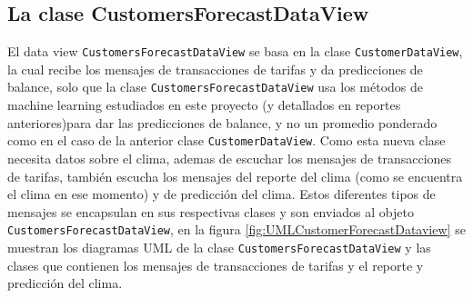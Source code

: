 \subsection{La clase CustomersForecastDataView}

El data view \texttt{CustomersForecastDataView} se basa en la clase \texttt{CustomerDataView}, la cual recibe los mensajes de transacciones de tarifas y da predicciones de balance, solo que la clase \texttt{CustomersForecastDataView} usa los métodos de machine learning estudiados en este proyecto (y detallados en reportes anteriores)para dar las predicciones de balance, y no un promedio ponderado como en el caso de la anterior clase \texttt{CustomerDataView}. Como esta nueva clase necesita datos sobre el clima, ademas de escuchar los mensajes de transacciones de tarifas, también escucha los mensajes del reporte del clima (como se encuentra el clima en ese momento) y de predicción del clima. Estos diferentes tipos de mensajes se encapsulan en sus respectivas clases y son enviados al objeto \texttt{CustomersForecastDataView}, en la figura \ref{fig:UMLCustomerForecastDataview} se muestran los diagramas UML de la clase \texttt{CustomersForecastDataView} y las clases que contienen los mensajes de transacciones de tarifas y el reporte y predicción del clima.

